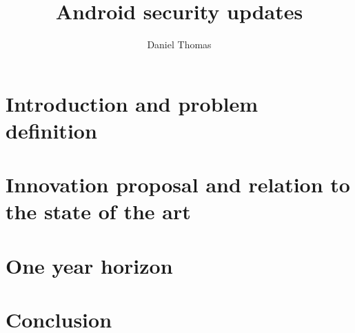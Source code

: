 \documentclass[a4paper,twocolumn]{article}
\author{Daniel Thomas}
\title{Android security updates}
\date{}%
\begin{document}
\maketitle

\section*{Introduction and problem definition}

\section*{Innovation proposal and relation to the state of the art}

\section*{One year horizon}

\section*{Conclusion}
\end{document}
